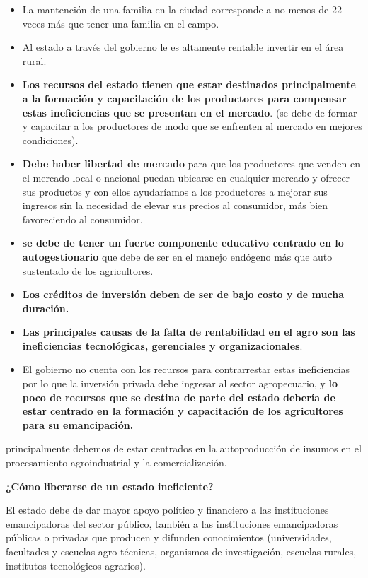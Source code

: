 \documentclass[
  letterpaper,
  DIV=11,
  numbers=noendperiod]{scrartcl}
\begin{document}
\begin{itemize}
\item
  La mantención de una familia en la ciudad corresponde a no menos de 22
  veces más que tener una familia en el campo.
\item
  Al estado a través del gobierno le es altamente rentable invertir en
  el área rural.
\item
  \textbf{Los recursos del estado tienen que estar destinados
  principalmente a la formación y capacitación de los productores para
  compensar estas ineficiencias que se presentan en el mercado}. (se
  debe de formar y capacitar a los productores de modo que se enfrenten
  al mercado en mejores condiciones).
\item
  \textbf{Debe haber libertad de mercado} para que los productores que
  venden en el mercado local o nacional puedan ubicarse en cualquier
  mercado y ofrecer sus productos y con ellos ayudaríamos a los
  productores a mejorar sus ingresos sin la necesidad de elevar sus
  precios al consumidor, más bien favoreciendo al consumidor.
\item
  \textbf{se debe de tener un fuerte componente educativo centrado en lo
  autogestionario} que debe de ser en el manejo endógeno más que auto
  sustentado de los agricultores.
\item
  \textbf{Los créditos de inversión deben de ser de bajo costo y de
  mucha duración.}
\item
  \textbf{Las principales causas de la falta de rentabilidad en el agro
  son las ineficiencias tecnológicas, gerenciales y organizacionales}.
\item
  El gobierno no cuenta con los recursos para contrarrestar estas
  ineficiencias por lo que la inversión privada debe ingresar al sector
  agropecuario, y \textbf{lo poco de recursos que se destina de parte
  del estado debería de estar} \textbf{centrado en la formación y
  capacitación de los agricultores para su emancipación.}
\end{itemize}

principalmente debemos de estar centrados en la autoproducción de
insumos en el procesamiento agroindustrial y la comercialización.

\textbf{¿Cómo liberarse de un estado ineficiente?}

El estado debe de dar mayor apoyo político y financiero a las
instituciones emancipadoras del sector público, también a las
instituciones emancipadoras públicas o privadas que producen y difunden
conocimientos (universidades, facultades y escuelas agro técnicas,
organismos de investigación, escuelas rurales, institutos tecnológicos
agrarios).
\end{document}
